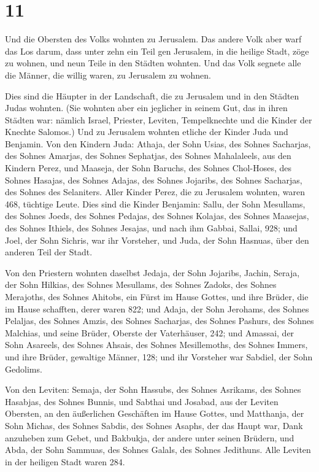 \hypertarget{section-10}{%
\section{11}\label{section-10}}

 Und die Obersten des Volks wohnten zu Jerusalem. Das
andere Volk aber warf das Los darum, dass unter zehn ein Teil gen
Jerusalem, in die heilige Stadt, zöge zu wohnen, und neun Teile in den
Städten wohnten.  Und das Volk segnete alle die Männer,
die willig waren, zu Jerusalem zu wohnen.

 Dies sind die Häupter in der Landschaft, die zu Jerusalem
und in den Städten Judas wohnten. (Sie wohnten aber ein jeglicher in
seinem Gut, das in ihren Städten war: nämlich Israel, Priester, Leviten,
Tempelknechte und die Kinder der Knechte Salomos.)  Und zu
Jerusalem wohnten etliche der Kinder Juda und Benjamin. Von den Kindern
Juda: Athaja, der Sohn Usias, des Sohnes Sacharjas, des Sohnes Amarjas,
des Sohnes Sephatjas, des Sohnes Mahalaleels, aus den Kindern Perez,
 und Maaseja, der Sohn Baruchs, des Sohnes Chol-Hoses, des
Sohnes Hasajas, des Sohnes Adajas, des Sohnes Jojaribs, des Sohnes
Sacharjas, des Sohnes des Selaniters.  Aller Kinder Perez,
die zu Jerusalem wohnten, waren 468, tüchtige Leute.  Dies
sind die Kinder Benjamin: Sallu, der Sohn Mesullams, des Sohnes Joeds,
des Sohnes Pedajas, des Sohnes Kolajas, des Sohnes Maasejas, des Sohnes
Ithiels, des Sohnes Jesajas,  und nach ihm Gabbai, Sallai,
928;  und Joel, der Sohn Sichris, war ihr Vorsteher, und
Juda, der Sohn Hasnuas, über den anderen Teil der Stadt.

 Von den Priestern wohnten daselbst Jedaja, der Sohn
Jojaribs, Jachin,  Seraja, der Sohn Hilkias, des Sohnes
Mesullams, des Sohnes Zadoks, des Sohnes Merajoths, des Sohnes Ahitobs,
ein Fürst im Hause Gottes,  und ihre Brüder, die im Hause
schafften, derer waren 822; und Adaja, der Sohn Jerohams, des Sohnes
Pelaljas, des Sohnes Amzis, des Sohnes Sacharjas, des Sohnes Pashurs,
des Sohnes Malchias,  und seine Brüder, Oberste der
Vaterhäuser, 242; und Amassai, der Sohn Asareels, des Sohnes Ahsais, des
Sohnes Mesillemoths, des Sohnes Immers,  und ihre Brüder,
gewaltige Männer, 128; und ihr Vorsteher war Sabdiel, der Sohn Gedolims.

 Von den Leviten: Semaja, der Sohn Hassubs, des Sohnes
Asrikams, des Sohnes Hasabjas, des Sohnes Bunnis,  und
Sabthai und Josabad, aus der Leviten Obersten, an den äußerlichen
Geschäften im Hause Gottes,  und Matthanja, der Sohn
Michas, des Sohnes Sabdis, des Sohnes Asaphs, der das Haupt war, Dank
anzuheben zum Gebet, und Bakbukja, der andere unter seinen Brüdern, und
Abda, der Sohn Sammuas, des Sohnes Galals, des Sohnes Jedithuns.
 Alle Leviten in der heiligen Stadt waren 284.

